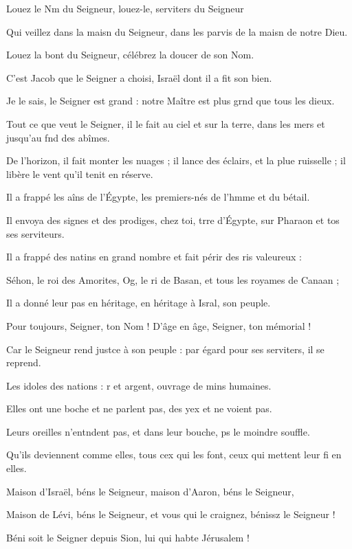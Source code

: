 \item Louez le Nm du Seigneur,\psstar{} louez-le, serviters du Seigneur
\item Qui veillez dans la maisn du Seigneur,\psstar{} dans les parvis de la maisn de notre Dieu.
\item Louez la bont du Seigneur,\psstar{} célébrez la doucer de son Nom.
\item C’est Jacob que le Seigner a choisi,\psstar{} Israël dont il a fit son bien.
\item Je le sais, le Seigner est grand :\psstar{} notre Maître est plus grnd que tous les dieux.
\item Tout ce que veut le Seigner, il le fait\psstar{} au ciel et sur la terre, dans les mers et jusqu’au fnd des abîmes.
\item De l’horizon, il fait monter les nuages ;\pscross{} il lance des éclairs, et la plue ruisselle ;\psstar{} il libère le vent qu’il tenit en réserve.
\item Il a frappé les aîns de l’Égypte,\psstar{} les premiers-nés de l’hmme et du bétail.
\item Il envoya des signes et des prodiges, chez toi, trre d’Égypte,\psstar{} sur Pharaon et tos ses serviteurs.
\item Il a frappé des natins en grand nombre\psstar{} et fait périr des ris valeureux :
\item Séhon, le roi des Amorites, Og, le ri de Basan,\psstar{} et tous les royames de Canaan ;
\item Il a donné leur pas en héritage,\psstar{} en héritage à Isral, son peuple.
\item Pour toujours, Seigner, ton Nom !\psstar{} D’âge en âge, Seigner, ton mémorial !
\item Car le Seigneur rend justce à son peuple :\psstar{} par égard pour ses serviters, il se reprend.
\item Les idoles des nations : r et argent,\psstar{} ouvrage de mins humaines.
\item Elles ont une boche et ne parlent pas,\psstar{} des yex et ne voient pas.
\item Leurs oreilles n’entndent pas,\psstar{} et dans leur bouche, ps le moindre souffle.
\item Qu’ils deviennent comme elles, tous cex qui les font,\psstar{} ceux qui mettent leur fi en elles.
\item Maison d’Israël, béns le Seigneur,\psstar{} maison d’Aaron, béns le Seigneur,
\item Maison de Lévi, béns le Seigneur,\psstar{} et vous qui le craignez, bénissz le Seigneur !
\item Béni soit le Seigner depuis Sion,\psstar{} lui qui habte Jérusalem !